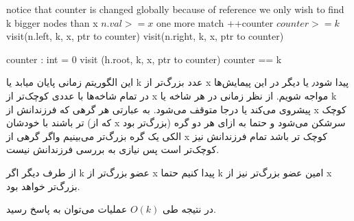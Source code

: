 \begin{latin}
\begin{codebox}
	\li \Comment notice that counter is changed globally because of reference
	\li \Comment we only wish to find k bigger nodes than x
	\li	\If $n.val >= x$ \Then 
	\li \Return \End
	\li \Comment one more match
	\li ++counter
	\li \If $counter >= k$ \Then 
	\li \Return
	\li visit(n.left, k, x, ptr to counter)
	\li visit(n.right, k, x, ptr to counter)
\end{codebox}

\begin{codebox}
	\li counter : int = 0
	\li visit (h.root, k, x, ptr to counter)
	\li \Return counter == k 
	\End
\end{codebox}
\end{latin}

این الگوریتم زمانی پایان میابد یا k عدد بزرگ‌تر از x پیدا شود٫ یا دیگر در این پیمایش‌ها در تمام شاخه‌ها با عددی کوچک‌تر از x مواجه شویم.
از نظر زمانی در هر شاخه یا k پیشروی می‌کند یا درجا متوقف می‌شود. به عبارتی هر گرهی که فرزندانش از x کوچک تر باشند با خودشان (که از x بزرگ‌تر بود)‌ سرشکن می‌شود و حتما به ازای هر دو گره الکی یک گره بزرگ‌تر می‌بینیم واگر گرهی از x کوچک تر باشد تمام فرزندانش نیز کوچک‌تر است پس نیازی به بررسی فرزندانش نیست.

از طرف دیگر
اگر k عضو بزرگ‌تر از x پیدا کنیم
حتما k امین عضو بزرگ‌تر نیز از x بزرگ‌تر خواهد بود.

در نتیجه طی $O(k)$ عملیات می‌توان به پاسخ رسید. 